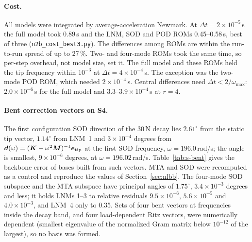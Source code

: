 \documentclass[11pt]{article}
\begin{document}
\paragraph{Cost.} All models were integrated by average-acceleration Newmark. At $\Delta t=2\times10^{-5}$\,s the full model took 0.89\,s and the LNM, SOD and POD ROMs 0.45--0.58\,s, best of three (\texttt{n2b\_cost\_best3.py}). The differences among ROMs are within the run-to-run spread of up to 27\,\%. Two- and four-mode ROMs took the same time, so per-step overhead, not model size, set it.
The full model and these ROMs held the tip frequency within $10^{-3}$ at $\Delta t=4\times10^{-4}$\,s. The exception was the two-mode POD ROM, which needed $2\times10^{-4}$\,s.
Central differences need $\Delta t<2/\omega_{\max}$: $2.0\times10^{-6}$\,s for the full model and $3.3$--$3.9\times10^{-4}$\,s at $r=4$.
\paragraph{Bent correction vectors on S4.} The first configuration SOD direction of the 30\,N decay lies $2.61^\circ$ from the static tip vector, $1.14^\circ$ from LNM~1 and $3\times10^{-4}$ degrees from $\bm{d}(\omega)=(\bm{K}-\omega^2\bm{M})^{-1}\bm{e}_{\mathrm{tip}}$ at the first SOD frequency, $\omega=196.0$\,rad/s; the angle is smallest, $9\times10^{-6}$ degrees, at $\omega=196.02$\,rad/s. Table~\ref{tab:s-bent} gives the backbone error of bases built from such vectors. MTA and SOD were recomputed as a control and reproduce the values of Section~\ref{sec:nlbb}. The four-mode SOD subspace and the MTA subspace have principal angles of $1.75^\circ$, $3.4\times10^{-3}$ degrees and less; it holds LNMs 1--3 to relative residuals $9.5\times10^{-6}$, $5.6\times10^{-5}$ and $4.0\times10^{-3}$, and LNM~4 only to 0.35. Sets of four bent vectors at frequencies inside the decay band, and four load-dependent Ritz vectors, were numerically dependent (smallest eigenvalue of the normalized Gram matrix below $10^{-12}$ of the largest), so no basis was formed.
\end{document}
